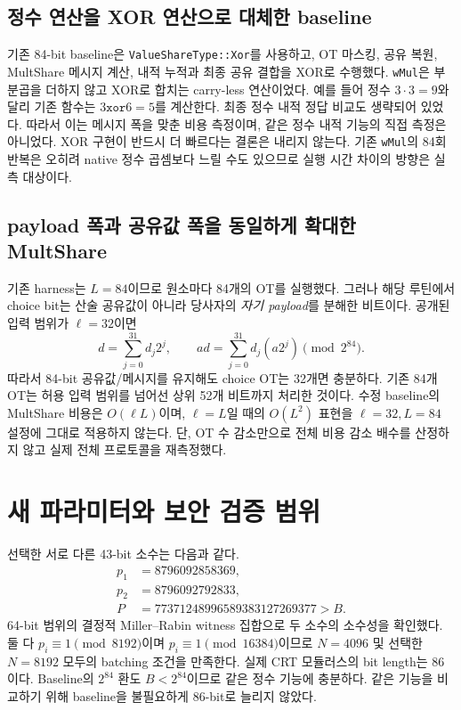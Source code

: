 \documentclass[11pt,a4paper]{article}
\begin{document}
\subsection{정수 연산을 XOR 연산으로 대체한 baseline}
기존 84-bit baseline은 \texttt{ValueShareType::Xor}를 사용하고,
OT 마스킹, 공유 복원, MultShare 메시지 계산, 내적 누적과 최종 공유 결합을 XOR로 수행했다.
\texttt{wMul}은 부분곱을 더하지 않고 XOR로 합치는 carry-less 연산이었다.
예를 들어 정수 $3\cdot3=9$와 달리 기존 함수는 $3\mathbin{\mathtt{xor}}6=5$를 계산한다.
최종 정수 내적 정답 비교도 생략되어 있었다.
따라서 이는 메시지 폭을 맞춘 비용 측정이며, 같은 정수 내적 기능의 직접 측정은 아니었다.
XOR 구현이 반드시 더 빠르다는 결론은 내리지 않는다. 기존 \texttt{wMul}의 84회 반복은
오히려 native 정수 곱셈보다 느릴 수도 있으므로 실행 시간 차이의 방향은 실측 대상이다.

\subsection{payload 폭과 공유값 폭을 동일하게 확대한 MultShare}
기존 harness는 $L=84$이므로 원소마다 84개의 OT를 실행했다.
그러나 해당 루틴에서 choice bit는 산술 공유값이 아니라 당사자의 \emph{자기 payload}를 분해한 비트이다.
공개된 입력 범위가 $\ell=32$이면
\[
 d=\sum_{j=0}^{31} d_j2^j,\qquad
 ad=\sum_{j=0}^{31}d_j(a2^j)\pmod{2^{84}}.
\]
따라서 84-bit 공유값/메시지를 유지해도 choice OT는 32개면 충분하다.
기존 84개 OT는 허용 입력 범위를 넘어선 상위 52개 비트까지 처리한 것이다.
수정 baseline의 MultShare 비용은 $O(\ell L)$이며,
$\ell=L$일 때의 $O(L^2)$ 표현을 $\ell=32,L=84$ 설정에 그대로 적용하지 않는다.
단, OT 수 감소만으로 전체 비용 감소 배수를 산정하지 않고 실제 전체 프로토콜을 재측정했다.

\section{새 파라미터와 보안 검증 범위}
선택한 서로 다른 43-bit 소수는 다음과 같다.
\begin{align*}
p_1&=8796092858369,\\
p_2&=8796092792833,\\
P&=77371248996589383127269377>B.
\end{align*}
64-bit 범위의 결정적 Miller--Rabin witness 집합으로 두 소수의 소수성을 확인했다.
둘 다 $p_i\equiv1\pmod{8192}$이며 $p_i\equiv1\pmod{16384}$이므로
$N=4096$ 및 선택한 $N=8192$ 모두의 batching 조건을 만족한다.
실제 CRT 모듈러스의 bit length는 86이다.
Baseline의 $2^{84}$ 환도 $B<2^{84}$이므로 같은 정수 기능에 충분하다.
같은 기능을 비교하기 위해 baseline을 불필요하게 86-bit로 늘리지 않았다.
\end{document}

